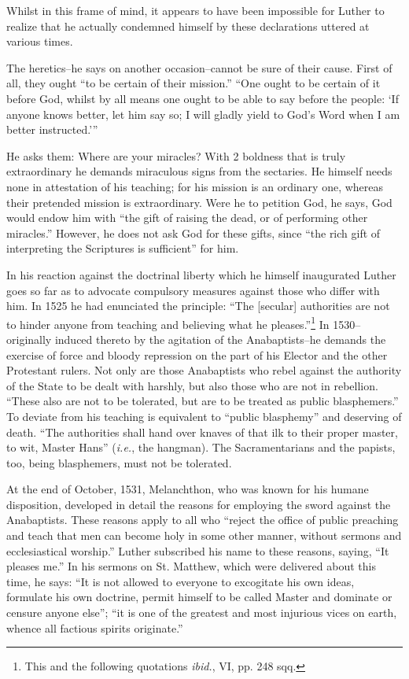 Whilst in this frame of mind, it appears to have been impossible for
Luther to realize that he actually condemned himself by these declarations
uttered at various times.

The heretics--he says on another occasion--cannot be sure of their cause.
First of all, they ought “to be certain of their mission.” “One ought to be
certain of it before God, whilst by all means one ought to be able to say
before the people: ‘If anyone knows better, let him say so; I will gladly
yield to God’s Word when I am better instructed.’”

He asks them: Where are your miracles? With 2 boldness that is truly
extraordinary he demands miraculous signs from the sectaries. He himself
needs none in attestation of his teaching; for his mission is an ordinary one,
whereas their pretended mission is extraordinary. Were he to petition God,
he says, God would endow him with “the gift of raising the dead, or of
performing other miracles.” However, he does not ask God for these gifts,
since “the rich gift of interpreting the Scriptures is sufficient” for him.

In his reaction against the doctrinal liberty which he himself inaugurated
Luther goes so far as to advocate compulsory measures against
those who differ with him. In 1525 he had enunciated the principle:
“The [secular] authorities are not to hinder anyone from teaching
and believing what he pleases.”\footnote{This and the following quotations \textit{ibid.}, VI, pp. 248 sqq.}
In 1530--originally induced thereto
by the agitation of the Anabaptists--he demands the exercise of force
and bloody repression on the part of his Elector and the other
Protestant rulers. Not only are those Anabaptists who rebel against
the authority of the State to be dealt with harshly, but also those who
are not in rebellion. “These also are not to be tolerated, but are to
be treated as public blasphemers.” To deviate from his teaching is
equivalent to “public blasphemy” and deserving of death. “The authorities
shall hand over knaves of that ilk to their proper master, to
wit, Master Hans” (\textit{i.e.}, the hangman). The Sacramentarians and the
papists, too, being blasphemers, must not be tolerated.

At the end of October, 1531, Melanchthon, who was known for his
humane disposition, developed in detail the reasons for employing the
sword against the Anabaptists. These reasons apply to all who “reject
the office of public preaching and teach that men can become holy
in some other manner, without sermons and ecclesiastical worship.”
Luther subscribed his name to these reasons, saying, “It pleases me.”
In his sermons on St. Matthew, which were delivered about this time,
he says: “It is not allowed to everyone to excogitate his own ideas,
formulate his own doctrine, permit himself to be called Master and
dominate or censure anyone else”; “it is one of the greatest and most
injurious vices on earth, whence all factious spirits originate.”

